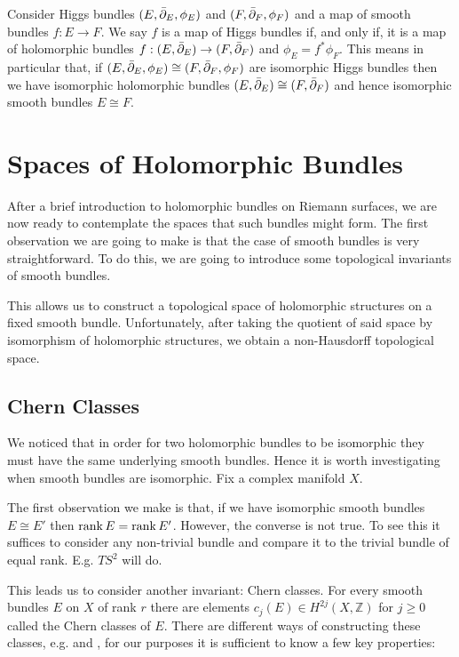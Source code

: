 \documentclass[12pt]{ociamthesis}  %
\begin{document}
Consider Higgs bundles $(E,{\bar{\partial}}_E,\phi_E)$ and $(F,{\bar{\partial}}_F,\phi_F)$
and a map of smooth bundles $f:E\to F$. We say $f$ is a map of Higgs
bundles if, and only if, it is a map of holomorphic bundles
$f:(E,{\bar{\partial}}_E)\to (F,{\bar{\partial}}_F)$ and $\phi_E = f^*\phi_F$.
This means in particular that, if
$(E,{\bar{\partial}}_E,\phi_E)\cong(F,{\bar{\partial}}_F,\phi_F)$
are isomorphic Higgs bundles then we have isomorphic holomorphic bundles
$(E,{\bar{\partial}}_E)\cong(F,{\bar{\partial}}_F)$ and hence isomorphic smooth bundles
$E\cong F$.

\section{Spaces of Holomorphic Bundles}

After a brief introduction to holomorphic bundles on Riemann surfaces,
we are now ready to contemplate the spaces that such bundles might
form. The first observation we are going to make is that the case of
smooth bundles is very straightforward. To do this, we are going to
introduce some topological invariants of smooth bundles.

This allows us to construct a topological space of holomorphic structures
on a fixed smooth bundle. Unfortunately, after taking the quotient
of said space by isomorphism of holomorphic structures, we obtain a
non-Hausdorff topological space.

\subsection{Chern Classes}

We noticed that in order for two holomorphic bundles to be isomorphic
they must have the same underlying smooth bundles. Hence it is worth
investigating when smooth bundles are isomorphic. Fix a complex
manifold $X$.

The first observation we make is that, if we have isomorphic smooth
bundles $E\cong E'$ then $\operatorname{rank} E = \operatorname{rank} E'$. However, the converse
is not true. To see this it suffices to consider any non-trivial
bundle and compare it to the trivial bundle of equal rank. E.g.
$TS^2$ will do.

This leads us to consider another invariant: Chern classes. For
every smooth bundles $E$ on $X$ of rank $r$ there are elements
$c_j(E)\in H^{2j}(X,\mathbb{Z})$ for $j\geq 0$ called the Chern
classes of $E$. There are different ways of constructing these classes,
e.g. \cite{fine2013} and \cite{griffiths1994}, for our purposes
it is sufficient to know a few key properties:
\end{document}
